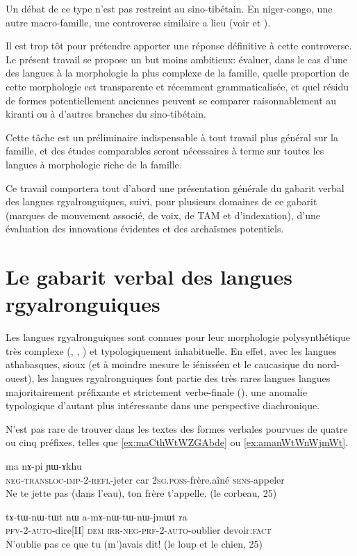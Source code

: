 \documentclass[oldfontcommands,oneside,a4paper,11pt]{article}
\newcommand{\ipa}[1]{{\phon \mbox{#1}}} %
\begin{document}
Un débat de ce type n'est pas restreint au sino-tibétain. En niger-congo, une autre macro-famille, une controverse similaire a lieu (voir  \citealt{guldeman08macrosudan} et  \citealt{hyman11macrosudan}). 

Il est trop tôt pour prétendre apporter une réponse définitive à cette controverse. Le présent travail se propose un but moins ambitieux: évaluer, dans le cas d'une des langues à la morphologie la plus complexe de la famille, quelle proportion de cette morphologie est transparente et récemment grammaticalisée, et quel résidu de formes potentiellement anciennes peuvent se comparer raisonnablement au kiranti ou à d'autres branches du sino-tibétain. 

Cette tâche est un préliminaire indispensable à tout travail plus général sur la famille, et des études comparables seront nécessaires à terme  sur toutes les langues à morphologie riche de la famille.


Ce travail comportera tout d'abord une présentation générale du gabarit verbal des langues rgyalronguiques, suivi, pour plusieurs domaines de ce gabarit (marques de mouvement associé, de voix, de TAM et d'indexation), d'une évaluation des innovations évidentes et des archaïsmes potentiels.

\section{Le gabarit verbal des langues rgyalronguiques}
Les langues rgyalronguiques sont connues pour leur morphologie polysynthétique très complexe (\citealt{jacques12incorp}, \citealt{lai13affixale}, \citealt{jackson14morpho}) et typologiquement inhabituelle. En effet, avec les langues athabasques, sioux (et à moindre mesure le iénisséen  et le caucasique du nord-ouest), les langues rgyalronguiques font partie des très rares langues langues majoritairement préfixante et strictement verbe-finale (\citealt{jacques13harmonization}), une anomalie typologique d'autant plus intéressante dans une perspective diachronique.
 
N'est pas rare de trouver dans les textes des formes verbales pourvues de quatre ou cinq préfixes, telles que \ref{ex:maCthWtWZGAbde} ou \ref{ex:amanWtWnWjmWt}. 


\begin{exe}
\ex \label{ex:maCthWtWZGAbde}
\gll \ipa{ma-ɕ-thɯ-tɯ-ʑɣɤ-βde}  	\ipa{ma}  	\ipa{nɤ-pi}  	\ipa{ɲɯ-ɤkhu}  \\
\textsc{neg-transloc-imp-2-refl}-jeter car \textsc{2sg.poss}-frère.aîné \textsc{sens}-appeler \\
\glt Ne te jette pas (dans l'eau), ton frère t'appelle. (le corbeau, 25)
\end{exe}
\begin{exe}
\ex  \label{ex:amanWtWnWjmWt}
\gll
\ipa{tɤ-tɯ-nɯ-tɯt}  	\ipa{nɯ}  	\ipa{a-mɤ-nɯ-tɯ-nɯ-jmɯt}  	\ipa{ra}  \\
\textsc{\textsc{pfv}-2-auto}-dire[II] \textsc{dem} \textsc{irr-neg-\textsc{prf}-2-auto}-oublier devoir:\textsc{fact} \\
\glt N'oublie pas ce que tu (m')avais dit! (le loup et le chien, 25)
\end{exe}
\end{document}

